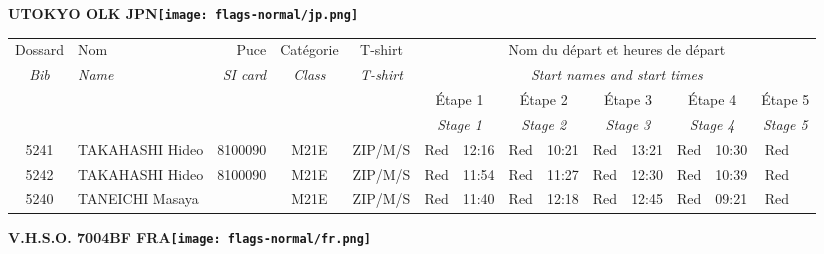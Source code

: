 \documentclass{report}
\begin{document}
\newpage
  \Huge \centering \bfseries UTOKYO OLK  JPN\normalfont \footnotesize \sffamily \hfill \texttt{[image: flags-normal/jp.png]} \newline 
  \begin{longtable}{|c|l|r|c|c|*{5}{cc|}}
    Dossard & Nom  & Puce    & Catégorie & T-shirt & \multicolumn{10}{c|}{Nom du départ et heures de départ} \\
    \itshape Bib     & \itshape Name & \itshape SI card & \itshape Class  & \itshape  T-shirt  & \multicolumn{10}{c|}{\itshape Start names and start times} \\
    \hline
    & & & & & \multicolumn{2}{c|}{Étape 1} & \multicolumn{2}{c|}{Étape 2} & \multicolumn{2}{c|}{Étape 3} & \multicolumn{2}{c|}{Étape 4} & \multicolumn{2}{c|}{Étape 5} \\
    & & & & & \multicolumn{2}{c|}{\itshape Stage 1} & \multicolumn{2}{c|}{\itshape Stage 2} & \multicolumn{2}{c|}{\itshape Stage 3} & \multicolumn{2}{c|}{\itshape Stage 4} & \multicolumn{2}{c|}{\itshape Stage 5} \\
    \hline
    5241 & TAKAHASHI Hideo & 8100090 & M21E & ZIP/M/S & Red & 12:16 & Red & 10:21 & Red & 13:21 & Red & 10:30 & Red &  \\
    5242 & TAKAHASHI Hideo & 8100090 & M21E & ZIP/M/S & Red & 11:54 & Red & 11:27 & Red & 12:30 & Red & 10:39 & Red &  \\
    5240 & TANEICHI Masaya &  & M21E & ZIP/M/S & Red & 11:40 & Red & 12:18 & Red & 12:45 & Red & 09:21 & Red &  \\
  \end{longtable}
\newpage
  \Huge \centering \bfseries V.H.S.O. 7004BF FRA\normalfont \footnotesize \sffamily \hfill \texttt{[image: flags-normal/fr.png]} \newline 
\end{document}

